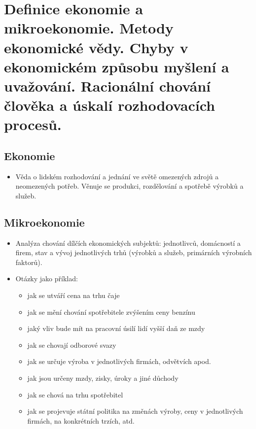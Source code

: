 \clearpage
\section{Definice ekonomie a mikroekonomie. Metody ekonomické vědy. Chyby
v ekonomickém způsobu myšlení a uvažování. Racionální chování člověka a úskalí
rozhodovacích procesů.}

\subsection{Ekonomie}
\begin{itemize}
    \item Věda o lidském rozhodování a jednání ve světě omezených zdrojů a neomezených potřeb.
    Věnuje se produkci, rozdělování a spotřebě výrobků a služeb.
\end{itemize}

\subsection{Mikroekonomie}
\begin{itemize}
    \item Analýza chování dílčích ekonomických subjektů: jednotlivců, domácností a firem,
    stav a vývoj jednotlivých trhů (výrobků a služeb, primárních výrobních faktorů).
    \item Otázky jako příklad:
    \begin{itemize}
        \item jak se utváří cena na trhu čaje
        \item jak se mění chování spotřebitele zvýšením ceny benzínu
        \item jaký vliv bude mít na pracovní úsilí lidí vyšší daň ze mzdy
        \item jak se chovají odborové svazy
        \item jak se určuje výroba v jednotlivých firmách, odvětvích apod.
        \item jak jsou určeny mzdy, zisky, úroky a jiné důchody
        \item jak se chová na trhu spotřebitel
        \item jak se projevuje státní politika na změnách výroby, ceny v jednotlivých firmách, na
        konkrétních trzích, atd.
    \end{itemize}
\end{itemize}

